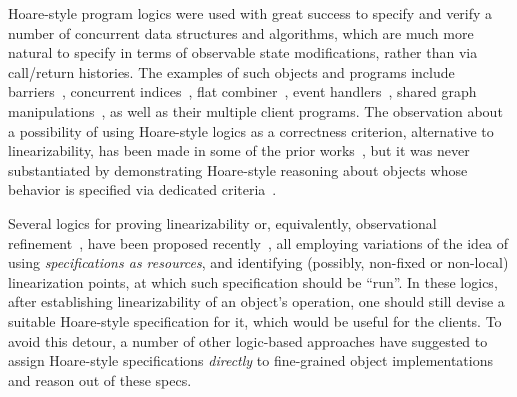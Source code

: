 Hoare-style program logics were used with great success to specify and
verify a number of concurrent data structures and algorithms, which
are much more natural to specify in terms of observable state
modifications, rather than via call/return histories. The examples of
such objects and programs include
barriers~\cite{Dodds-al:POPL11,Hobor-Gherghina:ESOP11}, concurrent
indices~\cite{ArrozPincho-al:OOPSLA11}, flat
combiner~\cite{Turon-al:ICFP13,Sergey-al:ESOP15}, event
handlers~\cite{Svendsen-Birkedal:ESOP14}, shared graph
manipulations~\cite{Raad-al:ESOP15,Sergey-al:PLDI15}, as well as their
multiple client programs.
%
The observation about a possibility of using Hoare-style logics as a
correctness criterion, alternative to linearizability, has been made
in some of the prior
works~\cite{ArrozPincho-al:OOPSLA11,Svendsen-al:ESOP13}, but it was
never substantiated by demonstrating Hoare-style reasoning about
objects whose behavior is specified via dedicated
criteria~\cite{Hemed-Rinetzky:PODC14,Aspnes-al:JACM94,Jagadeesan-Riely:ICALP14}.
%

Several logics for proving linearizability or, equivalently,
observational refinement~\cite{Filipovic-al:TCS10}, have been proposed
recently~\cite{Turon-al:ICFP13,Liang-Feng:PLDI13,Vafeiadis:PhD}, all
employing variations of the idea of using \emph{specifications as
  resources}, and identifying (possibly, non-fixed or non-local)
linearization points, at which such specification should be ``run''.
%
In these logics, after establishing linearizability of an object's
operation, one should still devise a suitable Hoare-style
specification for it, which would be useful for the clients.
%
To avoid this detour, a number of other logic-based approaches have
suggested to assign Hoare-style specifications \emph{directly} to
fine-grained object
implementations~\cite{Svendsen-al:ESOP13,Svendsen-Birkedal:ESOP14,ArrozPincho-al:ECOOP14}
and reason out of these specs.

